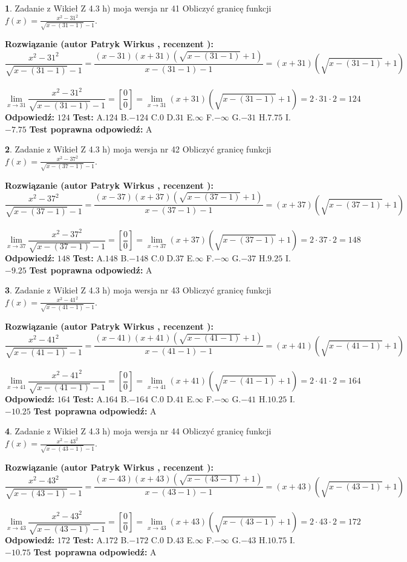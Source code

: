 \documentclass[12pt, a4paper]{article}
\theoremstyle{definition} %
\newtheorem{zad}{}
\newcommand{\zadStart}[1]{\begin{zad}#1\newline}
\newcommand{\zadStop}{\end{zad}}
\newcommand{\rozwStart}[2]{\noindent \textbf{Rozwiązanie (autor #1 , recenzent #2): }\newline}
\newcommand{\rozwStop}{\newline}
\newcommand{\odpStart}{\noindent \textbf{Odpowiedź:}\newline}
\newcommand{\odpStop}{\newline}
\newcommand{\testStart}{\noindent \textbf{Test:}\newline}
\newcommand{\testStop}{\newline}
\newcommand{\kluczStart}{\noindent \textbf{Test poprawna odpowiedź:}\newline}
\newcommand{\kluczStop}{\newline}
\begin{document}
\zadStart{Zadanie z Wikieł Z 4.3 h) moja wersja nr 41}
Obliczyć granicę funkcji $f(x)=\frac{x^{2} - 31^{2}}{\sqrt{x-(31-1)}-1}$.
\zadStop
\rozwStart{Patryk Wirkus}{}
$$\frac{x^{2} - 31^{2}}{\sqrt{x-(31-1)}-1}=\frac{(x-31)(x+31)(\sqrt{x-(31-1)}+1)}{x-(31-1)-1}=(x+31)(\sqrt{x-(31-1)}+1)$$
\\
$$\lim\limits_{x\to 31}\frac{x^{2} - 31^{2}}{\sqrt{x-(31-1)}-1}=[\frac{0}{0}]=
\lim\limits_{x\to 31}(x+31)(\sqrt{x-(31-1)}+1) = 2\cdot31 \cdot 2 = 124$$
\rozwStop
\odpStart
$124$
\odpStop
\testStart
A.$124$
B.$-124$
C.$0$
D.$31$
E.$\infty$
F.$-\infty$
G.$-31$
H.$7.75$
I.$-7.75$
\testStop
\kluczStart
A
\kluczStop



\zadStart{Zadanie z Wikieł Z 4.3 h) moja wersja nr 42}
Obliczyć granicę funkcji $f(x)=\frac{x^{2} - 37^{2}}{\sqrt{x-(37-1)}-1}$.
\zadStop
\rozwStart{Patryk Wirkus}{}
$$\frac{x^{2} - 37^{2}}{\sqrt{x-(37-1)}-1}=\frac{(x-37)(x+37)(\sqrt{x-(37-1)}+1)}{x-(37-1)-1}=(x+37)(\sqrt{x-(37-1)}+1)$$
\\
$$\lim\limits_{x\to 37}\frac{x^{2} - 37^{2}}{\sqrt{x-(37-1)}-1}=[\frac{0}{0}]=
\lim\limits_{x\to 37}(x+37)(\sqrt{x-(37-1)}+1) = 2\cdot37 \cdot 2 = 148$$
\rozwStop
\odpStart
$148$
\odpStop
\testStart
A.$148$
B.$-148$
C.$0$
D.$37$
E.$\infty$
F.$-\infty$
G.$-37$
H.$9.25$
I.$-9.25$
\testStop
\kluczStart
A
\kluczStop



\zadStart{Zadanie z Wikieł Z 4.3 h) moja wersja nr 43}
Obliczyć granicę funkcji $f(x)=\frac{x^{2} - 41^{2}}{\sqrt{x-(41-1)}-1}$.
\zadStop
\rozwStart{Patryk Wirkus}{}
$$\frac{x^{2} - 41^{2}}{\sqrt{x-(41-1)}-1}=\frac{(x-41)(x+41)(\sqrt{x-(41-1)}+1)}{x-(41-1)-1}=(x+41)(\sqrt{x-(41-1)}+1)$$
\\
$$\lim\limits_{x\to 41}\frac{x^{2} - 41^{2}}{\sqrt{x-(41-1)}-1}=[\frac{0}{0}]=
\lim\limits_{x\to 41}(x+41)(\sqrt{x-(41-1)}+1) = 2\cdot41 \cdot 2 = 164$$
\rozwStop
\odpStart
$164$
\odpStop
\testStart
A.$164$
B.$-164$
C.$0$
D.$41$
E.$\infty$
F.$-\infty$
G.$-41$
H.$10.25$
I.$-10.25$
\testStop
\kluczStart
A
\kluczStop



\zadStart{Zadanie z Wikieł Z 4.3 h) moja wersja nr 44}
Obliczyć granicę funkcji $f(x)=\frac{x^{2} - 43^{2}}{\sqrt{x-(43-1)}-1}$.
\zadStop
\rozwStart{Patryk Wirkus}{}
$$\frac{x^{2} - 43^{2}}{\sqrt{x-(43-1)}-1}=\frac{(x-43)(x+43)(\sqrt{x-(43-1)}+1)}{x-(43-1)-1}=(x+43)(\sqrt{x-(43-1)}+1)$$
\\
$$\lim\limits_{x\to 43}\frac{x^{2} - 43^{2}}{\sqrt{x-(43-1)}-1}=[\frac{0}{0}]=
\lim\limits_{x\to 43}(x+43)(\sqrt{x-(43-1)}+1) = 2\cdot43 \cdot 2 = 172$$
\rozwStop
\odpStart
$172$
\odpStop
\testStart
A.$172$
B.$-172$
C.$0$
D.$43$
E.$\infty$
F.$-\infty$
G.$-43$
H.$10.75$
I.$-10.75$
\testStop
\kluczStart
A
\kluczStop
\end{document}
